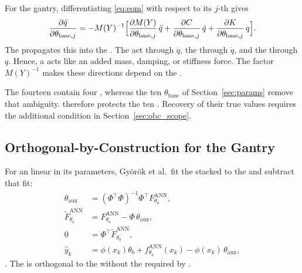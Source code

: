 For the gantry, differentiating \eqref{eq:eom} with respect to its $j$-th
 gives
\begin{equation}
 \frac{\partial\ddot q}{\partial\theta_{\mathrm{base},j}}
 =-M(Y)^{-1}\Bigl[\frac{\partial M(Y)}{\partial\theta_{\mathrm{base},j}}\,\ddot q
 +\frac{\partial C}{\partial\theta_{\mathrm{base},j}}\,\dot q
 +\frac{\partial K}{\partial\theta_{\mathrm{base},j}}\,q\Bigr].
\label{eq:obc_gantry_sens}
\end{equation}
The  propagates this  into the . The  act through $\ddot q$, the  through $\dot q$, and the  through $q$.
Hence, a  acts like an added mass, damping, or stiffness force.
The factor $M(Y)^{-1}$ makes these directions depend on the .

The fourteen  contain four , whereas
the ten  $\theta_{\mathrm{base}}$ of Section~\ref{sec:params}
remove that ambiguity.  therefore protects the ten .
Recovery of their true values requires the additional condition in
Section~\ref{sec:obc_scope}.

\subsection{Orthogonal-by-Construction for the Gantry}\label{sec:obc_map}
For an  linear in its parameters, Gy\"or\"ok et al.\ fit
the stacked  to the  and subtract that fit:
\begin{equation}
\begin{aligned}
 \theta_{\mathrm{aux}}&=(\Phi^\top\Phi)^{-1}\Phi^\top F^{\mathrm{ANN}}_{\theta_a},\\
 \widetilde F^{\mathrm{ANN}}_{\theta_a}&=F^{\mathrm{ANN}}_{\theta_a}-\Phi\,\theta_{\mathrm{aux}},\\
 0&=\Phi^\top\widetilde F^{\mathrm{ANN}}_{\theta_a},\\
 \hat y_k&=\phi(x_k)\theta_b+f^{\mathrm{ANN}}_{\theta_a}(x_k)-\phi(x_k)\,\theta_{\mathrm{aux}},
\end{aligned}
\label{eq:obc_gyorok}
\end{equation}
\cite[Eqs.~(8), (10), (11), (13)]{gyorok2026obc}.
The  is orthogonal to the  without the  required by \cite{gyorok2025l4dc}.

